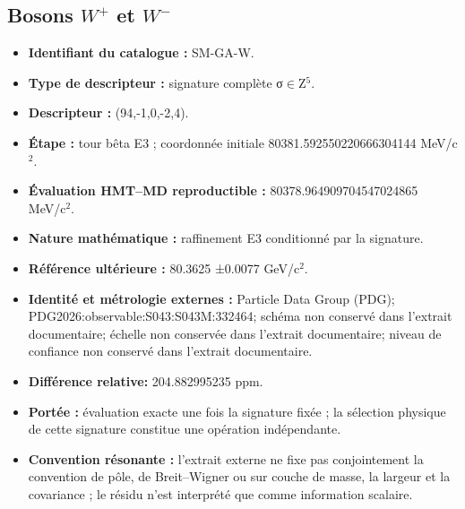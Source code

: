 \subsection{Bosons \texorpdfstring{\(W^{+}\)}{W+} et \texorpdfstring{\(W^{-}\)}{W−}}
\begin{itemize}
\item \textbf{Identifiant du catalogue :} SM-GA-W.
\item \textbf{Type de descripteur :} signature complète σ\(\in\)Z\({}^{5}\).
\item \textbf{Descripteur :} (94,-1,0,-2,4).
\item \textbf{Étape :} tour bêta E3 ; coordonnée initiale 80381.592550\allowbreak{}220666\allowbreak{}304144 MeV/c\({}^{2}\).
\item \textbf{Évaluation HMT--MD reproductible :} 80378.964909\allowbreak{}704547\allowbreak{}024865 MeV/c\({}^{2}\).
\item \textbf{Nature mathématique :} raffinement E3 conditionné par la signature.
\item \textbf{Référence ultérieure :} 80.3625 ±\allowbreak{}0.0077 GeV/c\({}^{2}\).
\item \textbf{Identité et métrologie externes :} Particle Data Group (PDG); PDG2026:\allowbreak{}observable:\allowbreak{}S043:\allowbreak{}S043M:\allowbreak{}332464; schéma non conservé dans l’extrait documentaire; échelle non conservée dans l’extrait documentaire; niveau de confiance non conservé dans l’extrait documentaire.
\item \textbf{Différence relative:} 204.882995\allowbreak{}235 ppm.
\item \textbf{Portée :} évaluation exacte une fois la signature fixée ; la sélection physique de cette signature constitue une opération indépendante.
\item \textbf{Convention résonante :} l’extrait externe ne fixe pas conjointement la convention de pôle, de Breit--Wigner ou sur couche de masse, la largeur et la covariance ; le résidu n’est interprété que comme information scalaire.
\end{itemize}
